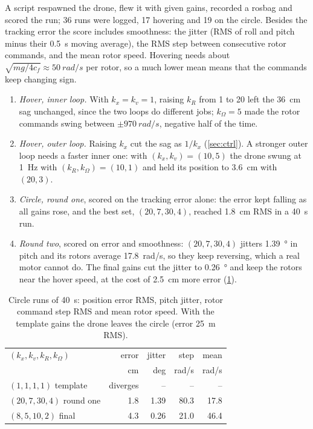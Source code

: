 \documentclass[a4paper]{tufte-handout}
\begin{document}
A script respawned the drone, flew it with given gains, recorded a rosbag and
scored the run; 36 runs were logged, 17 hovering and 19 on the circle.
Besides the tracking error the score includes smoothness: the jitter (RMS of roll
and pitch minus their \SI{0.5}{s} moving average), the RMS step between
consecutive rotor commands, and the mean rotor speed. Hovering needs about
$\sqrt{mg/4c_f}\approx\SI{50}{rad/s}$ per rotor, so a much lower mean means that
the commands keep changing sign.
\begin{enumerate}
\item \emph{Hover, inner loop.} With $k_x=k_v=1$, raising $k_R$ from 1 to 20 left
the \SI{36}{cm} sag unchanged, since the two loops do different jobs;
$k_\Omega=5$ made the rotor commands swing between $\pm\SI{970}{rad/s}$, negative
half of the time.
\item \emph{Hover, outer loop.} Raising $k_x$ cut the sag as $1/k_x$
(\cref{sec:ctrl}). A stronger outer loop needs a faster inner one: with
$(k_x,k_v)=(10,5)$ the drone swung at \SI{1}{Hz} with $(k_R,k_\Omega)=(10,1)$ and
held its position to \SI{3.6}{cm} with $(20,3)$.
\item \emph{Circle, round one}, scored on the tracking error alone: the error kept
falling as all gains rose, and the best set, $(20,7,30,4)$, reached \SI{1.8}{cm}
RMS in a \SI{40}{s} run.
\item \emph{Round two}, scored on error and smoothness: $(20,7,30,4)$ jitters
\SI{1.39}{\degree} in pitch and its rotors average \SI{17.8}{rad/s}, so they keep
reversing, which a real motor cannot do. The final gains cut the jitter to
\SI{0.26}{\degree} and keep the rotors near the hover speed, at the cost of
\SI{2.5}{cm} more error (\cref{tab:tune}).
\end{enumerate}

\begin{table}[h]
\small
\begin{tabular}{@{}lrrrr@{}}
\toprule
$(k_x,k_v,k_R,k_\Omega)$ & error & jitter & step & mean \\
 & cm & deg & rad/s & rad/s \\
\midrule
$(1,1,1,1)$ template & diverges & -- & -- & -- \\
$(20,7,30,4)$ round one & 1.8 & 1.39 & 80.3 & 17.8 \\
$(8,5,10,2)$ final & 4.3 & 0.26 & 21.0 & 46.4 \\
\bottomrule
\end{tabular}
\caption{Circle runs of \SI{40}{s}: position error RMS, pitch jitter, rotor
command step RMS and mean rotor speed. With the template gains the drone leaves the
circle (error \SI{25}{m} RMS).\protect\label{tab:tune}}
\end{table}
\end{document}
